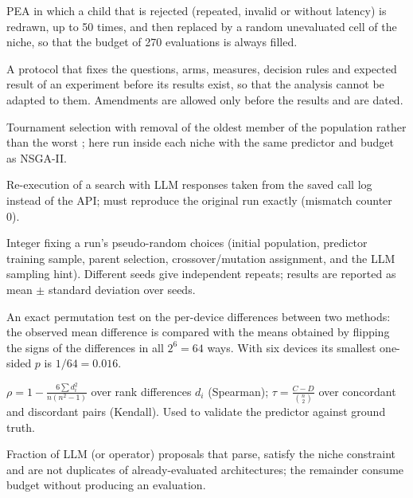 \documentclass[pdflatex,sn-mathphys-ay]{sn-jnl}
\begin{document}
\begin{appendices}
\begin{description}[style=nextline,leftmargin=0pt,itemsep=3pt]
\item[PEA with refilling.] PEA in which a child that is rejected (repeated, invalid or without latency) is redrawn, up to 50 times, and then replaced by a random unevaluated cell of the niche, so that the budget of 270 evaluations is always filled.

\item[Pre-registration.] A protocol that fixes the questions, arms, measures, decision rules and expected result of an experiment before its results exist, so that the analysis cannot be adapted to them. Amendments are allowed only before the results and are dated.

\item[Regularised (aging) evolution.] Tournament selection with removal of the oldest member of the population rather than the worst \cite{real19}; here run inside each niche with the same predictor and budget as NSGA-II.

\item[Replay.] Re-execution of a search with LLM responses taken from the saved call log instead of the API; must reproduce the original run exactly (mismatch counter 0).

\item[Seed.] Integer fixing a run's pseudo-random choices (initial population, predictor training sample, parent selection, crossover/mutation assignment, and the LLM sampling hint). Different seeds give independent repeats; results are reported as mean $\pm$ standard deviation over seeds.

\item[Sign-flip test.] An exact permutation test on the per-device differences between two methods: the observed mean difference is compared with the means obtained by flipping the signs of the differences in all $2^6=64$ ways. With six devices its smallest one-sided $p$ is $1/64=0.016$.

\item[Spearman / Kendall rank correlation.] $\rho=1-\frac{6\sum d_i^2}{n(n^2-1)}$ over rank differences $d_i$ (Spearman); $\tau=\frac{C-D}{\binom{n}{2}}$ over concordant and discordant pairs (Kendall). Used to validate the predictor against ground truth.

\item[Usable proposal rate.] Fraction of LLM (or operator) proposals that parse, satisfy the niche constraint and are not duplicates of already-evaluated architectures; the remainder consume budget without producing an evaluation.


\end{description}
\end{appendices}
\end{document}

